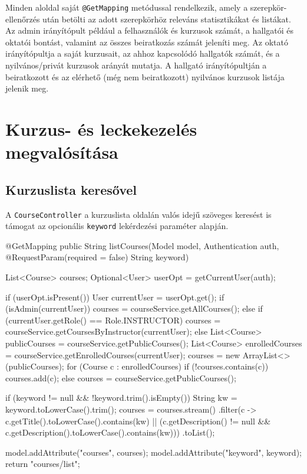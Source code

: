 Minden aloldal saját \texttt{@GetMapping} metódussal rendelkezik, amely a szerepkör-ellenőrzés után betölti az adott szerepkörhöz releváns statisztikákat és listákat. Az admin irányítópult például a felhasználók és kurzusok számát, a hallgatói és oktatói bontást, valamint az összes beiratkozás számát jeleníti meg. Az oktató irányítópultja a saját kurzusait, az ahhoz kapcsolódó hallgatók számát, és a nyilvános/privát kurzusok arányát mutatja. A hallgató irányítópultján a beiratkozott és az elérhető (még nem beiratkozott) nyilvános kurzusok listája jelenik meg.


\section{Kurzus- és leckekezelés megvalósítása}

\subsection{Kurzuslista keresővel}

A \texttt{CourseController} a kurzuslista oldalán valós idejű szöveges keresést is támogat az opcionális \texttt{keyword} lekérdezési paraméter alapján.

\begin{java}[caption={Kurzuslista összeállítása keresési funkcióval},label=java:courselist]
@GetMapping
public String listCourses(Model model, Authentication auth,
        @RequestParam(required = false) String keyword) {
    List<Course> courses;
    Optional<User> userOpt = getCurrentUser(auth);

    if (userOpt.isPresent()) {
        User currentUser = userOpt.get();
        if (isAdmin(currentUser)) {
            courses = courseService.getAllCourses();
        } else if (currentUser.getRole() == Role.INSTRUCTOR) {
            courses = courseService.getCoursesByInstructor(currentUser);
        } else {
            List<Course> publicCourses =
                    courseService.getPublicCourses();
            List<Course> enrolledCourses =
                    courseService.getEnrolledCourses(currentUser);
            courses = new ArrayList<>(publicCourses);
            for (Course c : enrolledCourses) {
                if (!courses.contains(c)) courses.add(c);
            }
        }
    } else {
        courses = courseService.getPublicCourses();
    }

    if (keyword != null && !keyword.trim().isEmpty()) {
        String kw = keyword.toLowerCase().trim();
        courses = courses.stream()
                .filter(c -> c.getTitle().toLowerCase().contains(kw)
                    || (c.getDescription() != null
                        && c.getDescription().toLowerCase().contains(kw)))
                .toList();
    }

    model.addAttribute("courses", courses);
    model.addAttribute("keyword", keyword);
    return "courses/list";
}
\end{java}

